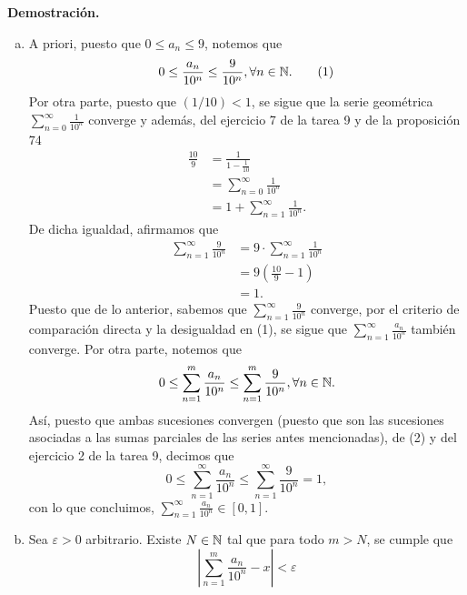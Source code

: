 \documentclass[11pt]{scrartcl}
\begin{document}
\textbf{Demostración.}
\begin{enumerate}[(a)]
    \item A priori, puesto que $0\leq a_n \leq 9$, notemos que
    \begin{equation*}
        0 \leq \frac{a_n}{10^n} \leq \frac{9}{10^n}, \forall n \in \mathbb N. \tag{1}
    \end{equation*}
    Por otra parte, puesto que $(1/10) < 1$, se sigue que la serie geométrica $\sum_{n=0}^{\infty}\frac{1}{10^n}$ converge
    y además, del ejercicio 7 de la tarea 9 y de la proposición 74
    \begin{align*}
        \frac{10}{9} &= \frac{1}{1-\frac{1}{10}} \\
        &= \sum_{n=0}^{\infty}\frac{1}{10^n} \\
        &= 1 + \sum_{n=1}^{\infty}\frac{1}{10^n}.
    \end{align*}
    De dicha igualdad, afirmamos que
    \begin{align*}
        \sum_{n=1}^{\infty}\frac{9}{10^n} &= 9\cdot \sum_{n=1}^{\infty}\frac{1}{10^n} \\
        &= 9\left(\frac{10}{9}-1\right) \\
        &= 1. \tag{2}
    \end{align*}
    Puesto que de lo anterior, sabemos que $\sum_{n=1}^{\infty}\frac{9}{10^n}$ converge, por el criterio de comparación directa
    y la desigualdad en (1), se sigue que $\sum_{n=1}^{\infty}\frac{a_n}{10^n}$ también converge. Por otra parte,
    notemos que
    \begin{equation*}
        0 \leq \sum_{n=1}^{m}\frac{a_n}{10^n} \leq \sum_{n=1}^{m}\frac{9}{10^n}, \forall n \in \mathbb N.
    \end{equation*}
    Así, puesto que ambas sucesiones convergen (puesto que son las sucesiones asociadas a las sumas parciales de las series antes
    mencionadas), de (2) y del ejercicio 2 de la tarea 9, decimos que
    \begin{equation*}
        0 \leq \sum_{n=1}^{\infty}\frac{a_n}{10^n} \leq \sum_{n=1}^{\infty}\frac{9}{10^n} = 1,
    \end{equation*}
    con lo que concluimos, $\sum_{n=1}^{\infty}\frac{a_n}{10^n} \in [0,1]$.
    \item Sea $\varepsilon > 0$ arbitrario. Existe $N \in \mathbb N$ tal que para todo $m > N$, se cumple que
    \begin{equation*}
        \left|\sum_{n=1}^{m}\frac{a_n}{10^n} - x\right| < \varepsilon
    \end{equation*}
\end{enumerate}
\end{document}
